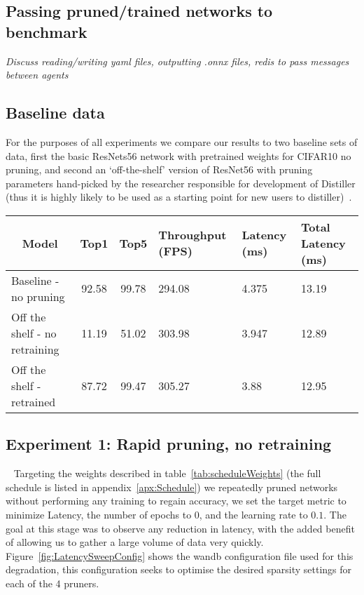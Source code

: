 \documentclass[../Dissertation.tex]{subfiles}
\begin{document}
\doublespacing

\subsection{Passing pruned/trained networks to benchmark}
\emph{Discuss reading/writing yaml files, outputting .onnx files, redis to pass messages between agents}

\subsection{Baseline data}\label{sec:baselineData}
For the purposes of all experiments we compare our results to two baseline sets of data, first the basic ResNets56 network with pretrained weights for CIFAR10 no pruning, and second an `off-the-shelf' version of ResNet56 with pruning parameters hand-picked by the researcher responsible for development of Distiller (thus it is highly likely to be used as a starting point for new users to distiller)~\autocite{liPruningFiltersEfficient2017}.

\begin{table}[H]
    \begin{tabular}{@{}lccp{25mm}p{23mm}p{28mm}@{}}
    \toprule
    \multicolumn{1}{c}{\textbf{Model}} & \textbf{Top1} & \textbf{Top5} & \textbf{Throughput (FPS)} & \textbf{Latency (ms)} & \textbf{Total Latency (ms)} \\ \midrule
    Baseline - no pruning              & 92.58         & 99.78         & 294.08                    & 4.375                 & 13.19                       \\
    Off the shelf - no retraining      & 11.19         & 51.02         & 303.98                    & 3.947                 & 12.89                       \\
    Off the shelf - retrained          &  87.72        & 99.47         & 305.27                    & 3.88                  & 12.95                           \\ \bottomrule
    \end{tabular}
\end{table}

\subsection{Experiment 1: Rapid pruning, no retraining}~\label{sec:ex1}
Targeting the weights described in table~\ref{tab:scheduleWeights} (the full schedule is listed in appendix~\ref{apx:Schedule}) we repeatedly pruned networks without performing any training to regain accuracy, we set the target metric to minimize Latency, the number of epochs to $0$, and the learning rate to $0.1$.
The goal at this stage was to observe any reduction in latency, with the added benefit of allowing us to gather a large volume of data very quickly.
Figure~\ref{fig:LatencySweepConfig} shows the wandb configuration file used for this degradation, this configuration seeks to optimise the desired sparsity settings for each of the 4 pruners.
\end{document}
